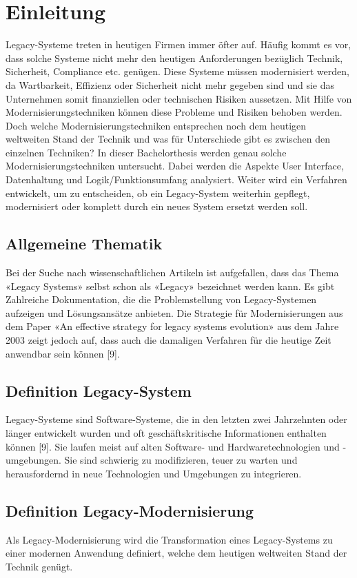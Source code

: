 \chapter{Einleitung}
Legacy-Systeme treten in heutigen Firmen immer öfter auf. Häufig kommt es vor, dass solche Systeme nicht mehr den heutigen Anforderungen bezüglich Technik, Sicherheit, Compliance etc. genügen. Diese Systeme müssen  modernisiert werden, da Wartbarkeit, Effizienz oder Sicherheit nicht mehr gegeben sind und sie das Unternehmen somit finanziellen oder technischen Risiken aussetzen. Mit Hilfe von Modernisierungstechniken können diese Probleme und Risiken behoben werden. Doch welche Modernisierungstechniken entsprechen noch dem heutigen weltweiten Stand der Technik und was für Unterschiede gibt es zwischen den einzelnen Techniken? In dieser Bachelorthesis werden genau solche Modernisierungstechniken untersucht. Dabei werden die Aspekte User Interface, Datenhaltung und Logik/Funktionsumfang analysiert. Weiter wird ein Verfahren entwickelt, um zu entscheiden, ob ein Legacy-System weiterhin gepflegt, modernisiert oder komplett durch ein neues System ersetzt werden soll.

\section{Allgemeine Thematik}
Bei der Suche nach wissenschaftlichen Artikeln ist aufgefallen, dass das Thema «Legacy Systems» selbst schon als «Legacy» bezeichnet werden kann. Es gibt Zahlreiche Dokumentation, die die Problemstellung von Legacy-Systemen aufzeigen und Lösungsansätze anbieten. Die Strategie für Modernisierungen aus dem Paper «An effective strategy for legacy systems evolution» aus dem Jahre 2003 zeigt jedoch auf, dass auch die damaligen Verfahren für die heutige Zeit anwendbar sein können [9].

\section{Definition Legacy-System}
Legacy-Systeme sind Software-Systeme, die in den letzten zwei Jahrzehnten oder länger entwickelt wurden und oft geschäftskritische Informationen enthalten können [9]. Sie laufen meist auf alten Software- und Hardwaretechnologien und -umgebungen. Sie sind schwierig zu modifizieren, teuer zu warten und herausfordernd in neue Technologien und Umgebungen zu integrieren.

\section{Definition Legacy-Modernisierung}
Als Legacy-Modernisierung wird die Transformation eines Legacy-Systems zu einer modernen Anwendung definiert, welche dem heutigen weltweiten Stand der Technik genügt. 

